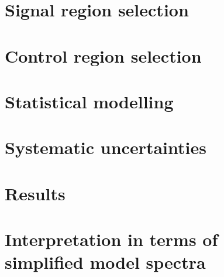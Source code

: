 
\section{Signal region selection \label{sec:boost_signal_selection}}

\section{Control region selection \label{sec:boost_control_selection}}

\section{Statistical modelling \label{sec:boost_likelihood}}


\section{Systematic uncertainties \label{sec:boost_systematics}}


\section{Results \label{sec:boost_results}}

\section{Interpretation in terms of simplified model spectra \label{sec:boost_interpretation}}

